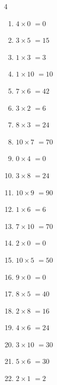 \begin{multicols}{4}
\begin{enumerate}
  \item $4\times 0$
        $=0$

  \item $3\times 5$
        $=15$

  \item $1\times 3$
        $=3$

  \item $1\times 10$
        $=10$

  \item $7\times 6$
        $=42$

  \item $3\times 2$
        $=6$

  \item $8\times 3$
        $=24$

  \item $10\times 7$
        $=70$

  \item $0\times 4$
        $=0$

  \item $3\times 8$
        $=24$

  \item $10\times 9$
        $=90$

  \item $1\times 6$
        $=6$

  \item $7\times 10$
        $=70$

  \item $2\times 0$
        $=0$

  \item $10\times 5$
        $=50$

  \item $9\times 0$
        $=0$

\columnbreak %

\resetques

  \item $8\times 5$
        $=40$

  \item $2\times 8$
        $=16$

  \item $4\times 6$
        $=24$

  \item $3\times 10$
        $=30$

  \item $5\times 6$
        $=30$

  \item $2\times 1$
        $=2$


\end{enumerate}
\end{multicols}
